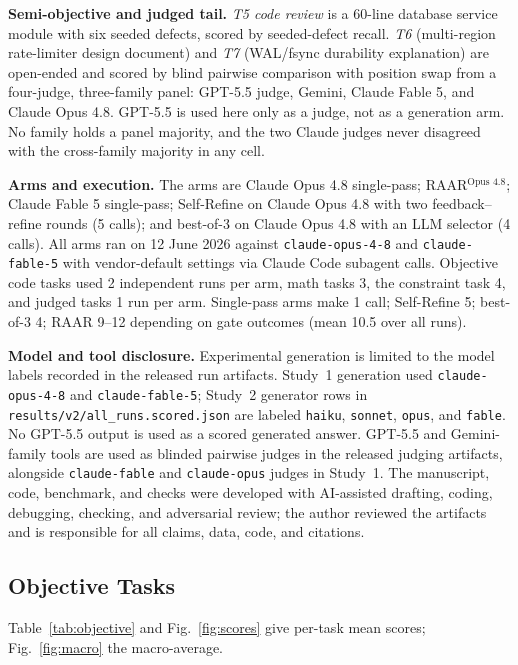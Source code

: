 \documentclass[journal]{IEEEtran}
\newcommand{\method}{RAAR}
\newcommand{\opus}{Claude Opus 4.8}
\newcommand{\fable}{Claude Fable 5}
\newcommand{\gptjudge}{GPT-5.5 judge}
\begin{document}
\textbf{Semi-objective and judged tail.} \emph{T5 code review} is a 60-line
database service module with six seeded defects, scored by seeded-defect
recall. \emph{T6} (multi-region rate-limiter design document) and
\emph{T7} (WAL/fsync durability explanation) are open-ended and scored by
blind pairwise comparison with position swap from a four-judge,
three-family panel: \gptjudge{}, Gemini, \fable{}, and \opus{}. GPT-5.5 is
used here only as a judge, not as a generation arm. No
family holds a panel majority, and the two Claude judges never disagreed
with the cross-family majority in any cell.

\textbf{Arms and execution.} The arms are \opus{} single-pass;
\method{}$^{\text{Opus 4.8}}$; \fable{} single-pass; Self-Refine on
\opus{} with two feedback--refine rounds (5 calls); and best-of-3 on
\opus{} with an LLM selector (4 calls). All arms ran on 12 June 2026
against \texttt{claude-opus-4-8} and \texttt{claude-fable-5} with
vendor-default settings via Claude Code subagent calls. Objective code
tasks used 2 independent runs per arm, math tasks 3, the constraint task
4, and judged tasks 1 run per arm. Single-pass arms make 1 call;
Self-Refine 5; best-of-3 4; \method{} 9--12 depending on gate outcomes
(mean 10.5 over all runs).

\textbf{Model and tool disclosure.} Experimental generation is limited to
the model labels recorded in the released run artifacts. Study~1 generation
used \texttt{claude-opus-4-8} and \texttt{claude-fable-5}; Study~2 generator
rows in \texttt{results/v2/all\_runs.scored.json} are labeled
\texttt{haiku}, \texttt{sonnet}, \texttt{opus}, and \texttt{fable}. No
GPT-5.5 output is used as a scored generated answer. GPT-5.5 and
Gemini-family tools are used as blinded pairwise judges in the released
judging artifacts, alongside \texttt{claude-fable} and
\texttt{claude-opus} judges in Study~1. The manuscript, code, benchmark,
and checks were developed with AI-assisted drafting, coding,
debugging, checking, and adversarial review; the author reviewed the artifacts
and is responsible for all claims, data, code, and citations.

\subsection{Objective Tasks}
\label{sec:objective-results}
Table~\ref{tab:objective} and Fig.~\ref{fig:scores} give per-task mean
scores; Fig.~\ref{fig:macro} the macro-average.
\end{document}
